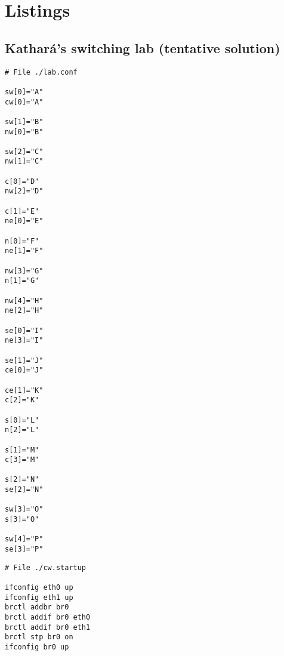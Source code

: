 \chapter{Listings}
\label{ch:listings}

\section{Kathará's switching lab (tentative solution)}

\begin{lstlisting}[frame=single,caption=Lab 2's topology configuration,captionpos=b,label=listlab2conf]
# File ./lab.conf

sw[0]="A"
cw[0]="A"

sw[1]="B"
nw[0]="B"

sw[2]="C"
nw[1]="C"

c[0]="D"
nw[2]="D"

c[1]="E"
ne[0]="E"

n[0]="F"
ne[1]="F"

nw[3]="G"
n[1]="G"

nw[4]="H"
ne[2]="H"

se[0]="I"
ne[3]="I"

se[1]="J"
ce[0]="J"

ce[1]="K"
c[2]="K"

s[0]="L"
n[2]="L"

s[1]="M"
c[3]="M"

s[2]="N"
se[2]="N"

sw[3]="O"
s[3]="O"

sw[4]="P"
se[3]="P"
\end{lstlisting}

\begin{lstlisting}[frame=single,caption=Example node startup configuration,captionpos=b,label=listlab2startup]
# File ./cw.startup

ifconfig eth0 up
ifconfig eth1 up
brctl addbr br0
brctl addif br0 eth0
brctl addif br0 eth1
brctl stp br0 on
ifconfig br0 up
\end{lstlisting}

